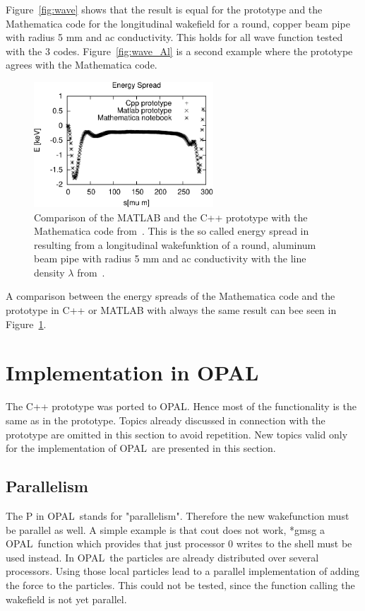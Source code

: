 \documentclass[11pt,a4paper]{article}
\newcommand{\opal}{\textsc{OPAL}}
\begin{document}
Figure~\ref{fig:wave} shows that the result is equal for the prototype and the Mathematica code for the longitudinal wakefield for a round, copper beam pipe with radius 5 mm and ac conductivity. This holds for all wave function tested with the 3 codes. Figure~\ref{fig:wave_Al} is a second example where the prototype agrees with the Mathematica code.

\begin{figure}[htb]
\begin{center}
\includegraphics[width=0.6\textwidth]{wakeCompare/energy_Lo_Circ_Al_AC_5.pdf}
\caption{Comparison of the MATLAB and the C++ prototype with the Mathematica code from~\cite{notebook}. This is the so called energy spread in~\cite{notebook} resulting from a longitudinal wakefunktion of a round, aluminum beam pipe with radius 5 mm and ac conductivity with the line density $\lambda$ from~\cite{notebook}. \label{fig:energy_Al} }
\end{center}
\end{figure}
A comparison between the energy spreads of the Mathematica code and the prototype in C++ or MATLAB with always the same result can bee seen in Figure~\ref{fig:energy_Al}.
\clearpage
\section{Implementation in \opal}

The C++ prototype was ported to \opal. Hence most of the functionality is the same as in the prototype. Topics already discussed in connection with the prototype are omitted in this section to avoid repetition. New topics valid only for the implementation of \opal\ are presented in this section.  


\subsection{Parallelism}
The P in \opal\ stands for "parallelism". Therefore the new wakefunction must be parallel as well. A simple example is that cout does not work, *gmsg a \opal\ function which provides that just processor 0 writes to the shell must be used instead.
In \opal\ the particles are already distributed over several processors. Using those local particles lead to a parallel implementation of adding the force to the particles. This could not be tested, since the function calling the wakefield is not yet parallel.
\end{document}

